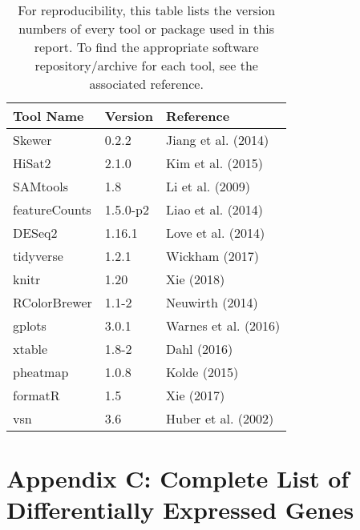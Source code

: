 \begin{table}[ht]
\centering
\begin{tabular}{lll}
  \hline
Tool Name & Version & Reference \\ 
  \hline
Skewer & 0.2.2 & Jiang et al. (2014) \\ 
  HiSat2 & 2.1.0 & Kim et al. (2015) \\ 
  SAMtools & 1.8 & Li et al. (2009) \\ 
  featureCounts & 1.5.0-p2 & Liao et al. (2014) \\ 
  DESeq2 & 1.16.1 & Love et al. (2014) \\ 
  tidyverse & 1.2.1 & Wickham (2017) \\ 
  knitr & 1.20 & Xie (2018) \\ 
  RColorBrewer & 1.1-2 & Neuwirth (2014) \\ 
  gplots & 3.0.1 & Warnes et al. (2016) \\ 
  xtable & 1.8-2 & Dahl (2016) \\ 
  pheatmap & 1.0.8 & Kolde (2015) \\ 
  formatR & 1.5 & Xie (2017) \\ 
  vsn & 3.6 & Huber et al. (2002) \\ 
   \hline
\end{tabular}
\caption{For reproducibility, this table lists the version numbers of every tool or package used in this report. To find the appropriate software repository/archive for each tool, see the associated reference.} 
\label{tbl:tools}
\end{table}

\pagebreak
\section{Appendix C: Complete List of Differentially Expressed Genes}

